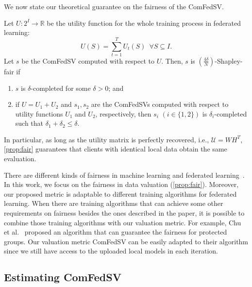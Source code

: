 We now state our theoretical guarantee on the fairness of the ComFedSV. 

\begin{theorem} \label{prop:fair}
    Let $U: 2^I \to \mathbb{R}$ be the utility function for the whole training process in federated learning: 
    \[U(S) = \sum_{t=1}^T U_t(S) \enspace \forall S \subseteq I.\]
    Let $s$ be the ComFedSV computed with respect to $U$.  Then, $s$ is $(\frac{4\delta}{N})$-Shapley-fair if
    \begin{enumerate}
        \item  $s$ is $\delta$-completed for some $\delta > 0$; and 
        \item if $U = U_1 + U_2$ and $s_1, s_2$ are the ComFedSVs computed with respect to utility functions $U_1$ and $U_2$, respectively, then $s_i$ $(i \in \{1,2\})$ is $\delta_i$-completed such that $\delta_1 + \delta_2 \leq \delta$. 
    \end{enumerate}
\end{theorem}

In particular, as long as the utility matrix is perfectly recovered, i.e., $\mathcal{U} = WH^T$, \autoref{prop:fair} guarantees that clients with identical local data obtain the same evaluation.

There are different kinds of fairness in machine learning and federated learning~\cite{zemel2013learning,donini2018empirical,li2019fair,lyu2020collaborative,chu2021fedfair}. In this work, we focus on the fairness in data valuation (\autoref{prop:fair}). Moreover, our proposed metric is adaptable to different training algorithms for federated learning. When there are training algorithms that can achieve some other requirements on fairness besides the ones described in the paper, it is possible to combine those training algorithms with our valuation metric. For example, Chu et al.~\cite{chu2021fedfair} proposed an algorithm that can guarantee the fairness for protected groups. Our valuation metric ComFedSV can be easily adapted to their algorithm since we still have access to the uploaded local models in each iteration.

\subsection{Estimating ComFedSV} \label{sec:7-6-5}

